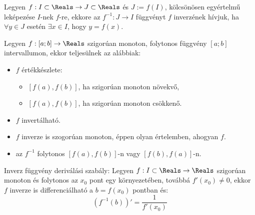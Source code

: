 \begin{definition}
  Legyen $f: I \subset \Reals \rightarrow J \subset \Reals$ és $J:= f(I)$,
  kölcsönösen egyértelmű leképezése $I$-nek $f$-re, ekkore az $f^{-1} : J
    \rightarrow I$ függvényt $f$ inverzének hívjuk, ha $\forall y \in J$ esetén
  $\exists x \in I$, hogy $y = f(x)$.

  \begin{center}
  \end{center}
\end{definition}


\begin{theorem}
  Legyen $f: [a;b] \rightarrow \Reals$ szigorúan monoton, folytonos függvény
  $[a;b]$ intervallumon, ekkor teljesülnek az alábbiak:
  \begin{itemize}
    \item $f$ értékkészlete:
          \begin{itemize}
            \item $[f(a), f(b)]$, ha szigorúan monoton növekvő,
            \item $[f(a), f(b)]$, ha szigorúan monoton csökkenő.
          \end{itemize}
    \item $f$ invertálható.
    \item $f$ inverze is szogorúan monoton, éppen olyan értelemben, ahogyan $f$.
    \item az $f^{-1}$ folytonos $[f(a), f(b)]$-n vagy $[f(b), f(a)]$-n.
  \end{itemize}
\end{theorem}

\begin{statement}
  Inverz függvény deriválási szabály: Legyen $f: I \subset \Reals \rightarrow
    \Reals$ szigorúan monoton és folytonos az $x_0$ pont egy környezetében,
  továbbá $f'(x_0) \neq 0$, ekkor $f$ inverze is differenciálható a $b = f(x_0)$
  pontban és:
  \[
    (f^{-1}(b))' = \frac{1}{f'(x_0)}
  \]
\end{statement}